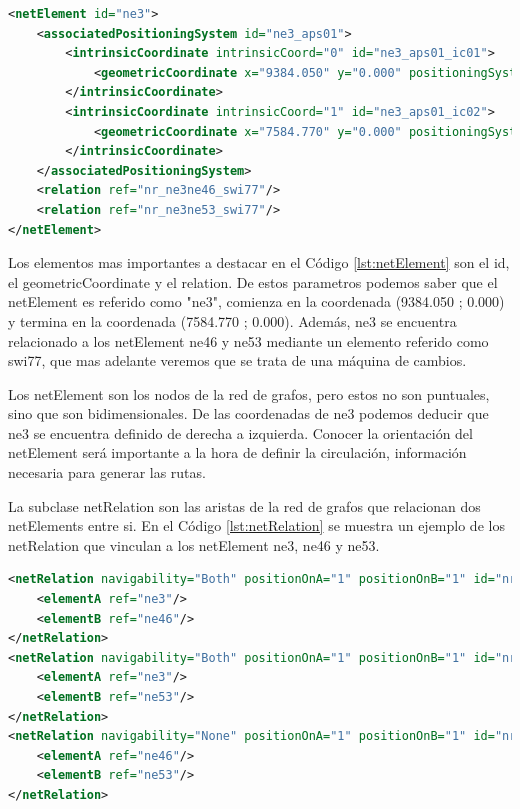     \begin{lstlisting}[language = XML, caption = Clase netElement , label = {lst:netElement}]
<netElement id="ne3">
    <associatedPositioningSystem id="ne3_aps01">
        <intrinsicCoordinate intrinsicCoord="0" id="ne3_aps01_ic01">
            <geometricCoordinate x="9384.050" y="0.000" positioningSystemRef="gps01"/>
        </intrinsicCoordinate>
        <intrinsicCoordinate intrinsicCoord="1" id="ne3_aps01_ic02">
            <geometricCoordinate x="7584.770" y="0.000" positioningSystemRef="gps01"/>
        </intrinsicCoordinate>
    </associatedPositioningSystem>
    <relation ref="nr_ne3ne46_swi77"/>
    <relation ref="nr_ne3ne53_swi77"/>
</netElement>
    \end{lstlisting}
    
    Los elementos mas importantes a destacar en el Código \ref{lst:netElement} son el id, el geometricCoordinate y el relation. De estos parametros podemos saber que el netElement es referido como "ne3", comienza en la coordenada (9384.050 ; 0.000) y termina en la coordenada (7584.770 ; 0.000). Además, ne3 se encuentra relacionado a los netElement ne46 y ne53 mediante un elemento referido como swi77, que mas adelante veremos que se trata de una máquina de cambios.

    Los netElement son los nodos de la red de grafos, pero estos no son puntuales, sino que son bidimensionales. De las coordenadas de ne3 podemos deducir que ne3 se encuentra definido de derecha a izquierda. Conocer la orientación del netElement será importante a la hora de definir la circulación, información necesaria para generar las rutas.

    La subclase netRelation son las aristas de la red de grafos que relacionan dos netElements entre si. En el Código \ref{lst:netRelation} se muestra un ejemplo de los netRelation que vinculan a los netElement ne3, ne46 y ne53.    
    
    \begin{lstlisting}[language = XML, caption = Clase netRelation , label = {lst:netRelation}]
<netRelation navigability="Both" positionOnA="1" positionOnB="1" id="nr_ne3ne46_swi77">
    <elementA ref="ne3"/>
    <elementB ref="ne46"/>
</netRelation>
<netRelation navigability="Both" positionOnA="1" positionOnB="1" id="nr_ne3ne53_swi77">
    <elementA ref="ne3"/>
    <elementB ref="ne53"/>
</netRelation>
<netRelation navigability="None" positionOnA="1" positionOnB="1" id="nr_ne46ne53_swi77">
    <elementA ref="ne46"/>
    <elementB ref="ne53"/>
</netRelation>
    \end{lstlisting}
    
